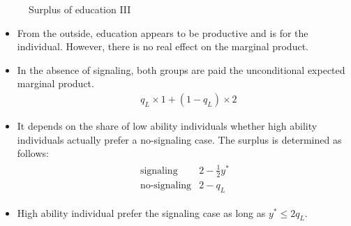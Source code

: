 \begin{frame}\begin{figure}[htp]\centering
\caption{Surplus of education III}
\end{figure}\end{frame}
\begin{frame}
\begin{itemize}\setlength\itemsep{1em}
\item From the outside, education appears to be productive and is for the individual. However, there is no real effect on the marginal product.
\end{itemize}
\end{frame}
\begin{frame}
\begin{itemize}\setlength\itemsep{1em}
\item In the absence of signaling, both groups are paid the unconditional expected marginal product.
	\begin{align*}
	   &  q_L\times 1 + (1 - q_L) \times 2
	\end{align*}
\end{itemize}
\end{frame}
\begin{frame}
\begin{itemize}\setlength\itemsep{1em}
\item It depends on the share of low ability individuals whether high ability individuals actually prefer a no-signaling case. The surplus is determined as follows:
	\begin{align*}\begin{array}{ll}
	\text{signaling}    & 2 - \tfrac{1}{2} y^* \\
	\text{no-signaling} & 2 - q_L
	\end{array}\end{align*}
\item High ability individual prefer the signaling case as long as $y^* \leq 2 q_L$.
\end{itemize}
\end{frame}
